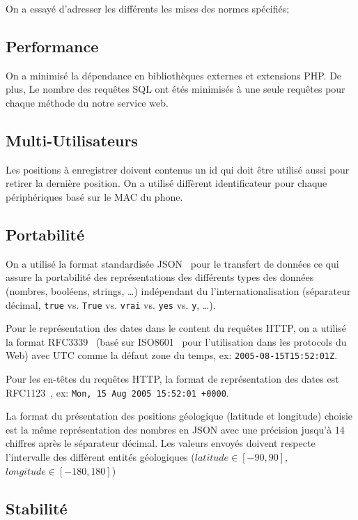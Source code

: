 On a essayé d'adresser les différents les mises des normes spécifiés;

\subsection{Performance}

On a minimisé la dépendance en bibliothèques externes et extensions PHP\@. De
plus, Le nombre des requêtes SQL ont étés minimisés à une seule requêtes pour
chaque méthode du notre service web.

\subsection{Multi-Utilisateurs}

Les positions à enregistrer doivent contenus un id qui doit être utilisé aussi
pour retirer la dernière position. On a utilisé diffèrent identificateur pour
chaque périphériques basé sur le MAC du phone.

\subsection{Portabilité}

On a utilisé la format standardisée JSON~\cite{ECMA-404} pour le transfert de
données ce qui assure la portabilité des représentations des différents types
des données (nombres, booléens, strings, \ldots) indépendant du
l'internationalisation (séparateur décimal, \verb|true| vs. \verb|True| vs.
\verb|vrai| vs. \verb|yes| vs. \verb|y|, \ldots).

Pour le représentation des dates dans le content du requêtes HTTP, on a utilisé
la format RFC3339~\cite{RFC3339} (basé sur ISO8601~\cite{ISO8601} pour
l'utilisation dans les protocols du Web) avec UTC comme la défaut zone du
temps, ex: \verb|2005-08-15T15:52:01Z|.

Pour les en-têtes du requêtes HTTP, la format de représentation des dates est
RFC1123~\cite{RFC1123}, ex: \verb|Mon, 15 Aug 2005 15:52:01 +0000|.

La format du présentation des positions géologique (latitude et longitude)
choisie est la même représentation des nombres en JSON avec une précision
jusqu'à 14 chiffres après le séparateur décimal. Les valeurs envoyés doivent
respecte l'intervalle des diffèrent entités géologiques ($latitude \in [-90,
90]$, $longitude \in [-180, 180]$)

\subsection{Stabilité}

